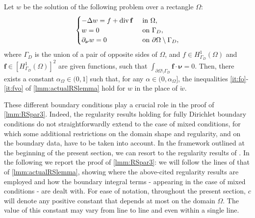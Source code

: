 \documentclass[final,hidelinks]{siamart1116Arxiv}
\numberwithin{theorem}{section}
\newcommand{\Div}{{\rm div}\,}
\newcommand{\normal}{{\boldsymbol \nu}}
\begin{document}
\begin{lemma}\label{lmm:RSpar3}
 Let $w$ be the solution of the following problem over a rectangle $\Omega$:
 \begin{equation}\label{eq:pbRSpar3}\begin{cases}
  -\Delta w = f+\Div\mathbf f & \text{ in }\Omega,\\
  w = 0 & \text{ on }\Gamma_D,\\
  \partial_\normal w = 0 & \text{ on }\partial\Omega\setminus\Gamma_D,
 \end{cases}\end{equation}
 where $\Gamma_D$ is the union of a pair of opposite sides of $\Omega$, and $f\in H^1_{\Gamma_D}(\Omega)$ and $\mathbf f\in[H^1_{\Gamma_D}(\Omega)]^2$ are given functions, such that $\int_{\partial\Omega\setminus\Gamma_D}\mathbf f\cdot\normal=0$.
 Then, there exists a constant $\alpha_\Omega\in(0,1]$ such that, for any $\alpha\in(0,\alpha_\Omega]$, the inequalities \ref{it:fo}-\ref{it:fvo} of \cref{lmm:actualRSlemma} hold for $w$ in the place of $\check w$.
\end{lemma}

These different boundary conditions play a crucial role in the proof of  \cref{lmm:RSpar3}.
Indeed, the regularity results holding for fully Dirichlet boundary conditions do not straightforwardly extend to the case of mixed conditions, for which some additional restrictions on the domain shape and regularity, and on the boundary data, have to be taken into account.
In the framework outlined at the beginning of the present section, we can resort to the regularity results of \cite{Grisvard,Lorenzi}.
In the following we report the proof of \cref{lmm:RSpar3}: we will follow the lines of that of \cref{lmm:actualRSlemma}, showing where the above-cited regularity results are employed and how the boundary integral terms - appearing in the case of mixed conditions - are dealt with.
For ease of notation, throughout the present section, $c$ will denote any positive constant that depends at most on the domain $\Omega$.
The value of this constant may vary from line to line and even within a single line.
\end{document}
